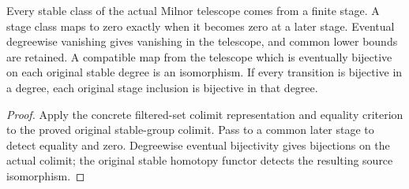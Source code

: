 \begin{proposition}
  \label{prop:actual-milnor-finite-stage-detection}
  \leanok
  Every stable class of the actual Milnor telescope comes from a finite stage. A stage class maps to zero exactly when it becomes zero at a later stage. Eventual degreewise vanishing gives vanishing in the telescope, and common lower bounds are retained. A compatible map from the telescope which is eventually bijective on each original stable degree is an isomorphism. If every transition is bijective in a degree, each original stage inclusion is bijective in that degree.
\end{proposition}
\begin{proof}
  Apply the concrete filtered-set colimit representation and equality criterion to the proved original stable-group colimit. Pass to a common later stage to detect equality and zero. Degreewise eventual bijectivity gives bijections on the actual colimit; the original stable homotopy functor detects the resulting source isomorphism.
  \leanok
\end{proof}

